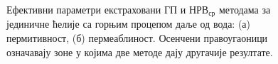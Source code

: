 \begin{figure}[!t]
\centering
{}
\caption{Ефективни параметри екстраховани ГП и $НРВ_{ср}$ методама за јединичне ћелије са горњим процепом даље од вода: (а) пермитивност, (б) пермеаблиност. Осенчени правоугаоници означавају зоне у којима две методе дају другачије резултате.}
\label{fig14_3}
\end{figure}

